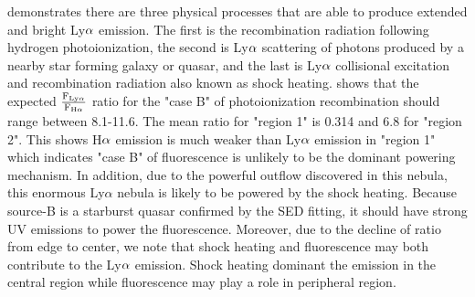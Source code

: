 \documentclass{subfiles}
\begin{document}
	\citet{Cantalupo_2017} demonstrates there are three physical processes that are able to produce extended and bright Ly$\rm \alpha$ emission. The first is the recombination radiation following hydrogen photoionization, the second is Ly$\rm \alpha$ scattering of photons produced by a nearby star forming galaxy or quasar, and the last is Ly$\rm \alpha$ collisional excitation and recombination radiation also known as shock heating. \citet{Leibler_2018} shows that the expected $\rm \frac{F_{Ly\alpha}}{F_{H\alpha}}$ ratio for the "case B" of photoionization recombination should range between 8.1-11.6. The mean ratio for "region 1" is 0.314 and 6.8 for "region 2". This shows H$\rm \alpha$ emission is much weaker than Ly$\rm \alpha$ emission in "region 1" which indicates "case B" of fluorescence is unlikely to be the dominant powering mechanism. In addition, due to the powerful outflow discovered in this nebula, this enormous Ly$\alpha$ nebula is likely to be powered by the shock heating. Because source-B is a starburst quasar confirmed by the SED fitting, it should have strong UV emissions to power the fluorescence. Moreover, due to the decline of ratio from edge to center, we note that shock heating and fluorescence may both contribute to the Ly$\rm \alpha$ emission. Shock heating dominant the emission in the central region while fluorescence may play a role in peripheral region.
\end{document}
